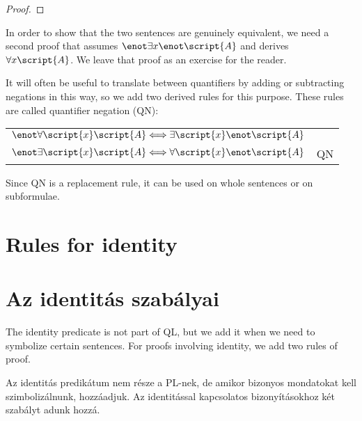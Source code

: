 \begin{proof}
	 
	\open
		\open
			\open
			\close
		\close
	\close
\end{proof}

In order to show that the two sentences are genuinely equivalent, we need a second proof that assumes $\enot\exists x\enot\script{A}$ and derives $\forall x\script{A}$. We leave that proof as an exercise for the reader.

It will often be useful to translate between quantifiers by adding or subtracting negations in this way, so we add two derived rules for this purpose. These rules are called quantifier negation (QN):
\begin{center}
\begin{tabular}{rl}
$\enot\forall\script{x}\script{A} \Longleftrightarrow \exists\script{x}\enot\script{A}$\\
$\enot\exists\script{x}\script{A} \Longleftrightarrow \forall\script{x}\enot\script{A}$
& QN
\end{tabular}
\end{center}
Since QN is a replacement rule, it can be used on whole sentences or on subformulae.



\section*{Rules for identity}
\section{Az identitás szabályai}
The identity predicate is not part of QL, but we add it when we need to symbolize certain sentences. For proofs involving identity, we add two rules of proof.

Az identitás predikátum nem része a PL-nek, de amikor bizonyos mondatokat kell szimbolizálnunk, hozzáadjuk. Az identitással kapcsolatos bizonyításokhoz két szabályt adunk hozzá.

